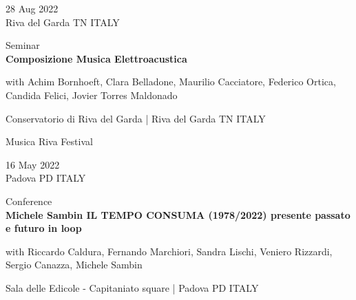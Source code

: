\documentclass[7pt,a4paper]{article}
\begin{document}
\begin{mdframed}[
    backgroundcolor=entrygray,
    linecolor=entrygray,
    linewidth=0pt,
    innerleftmargin=6pt,
    innerrightmargin=6pt,
    innertopmargin=6pt,
    innerbottommargin=6pt,
    skipabove=0pt,
    skipbelow=0pt
]

\begin{minipage}[t]{0.28\textwidth}

28 Aug 2022
\\\scriptsize Riva del Garda TN ITALY

\end{minipage}
\begin{minipage}[t]{0.68\textwidth}
\small Seminar
\\\normalsize \textbf{Composizione Musica Elettroacustica}
\par \scriptsize with Achim Bornhoeft, Clara Belladone, Maurilio Cacciatore, Federico Ortica, Candida Felici, Jovier Torres Maldonado
\par \small Conservatorio di Riva del Garda | \scriptsize Riva del Garda TN ITALY
\vspace{0.1cm}
\par \scriptsize Musica Riva Festival
\end{minipage}
\vspace{0.25cm}
\end{mdframed}


\begin{mdframed}[
    backgroundcolor=white,
    linecolor=white,
    linewidth=0pt,
    innerleftmargin=6pt,
    innerrightmargin=6pt,
    innertopmargin=6pt,
    innerbottommargin=6pt,
    skipabove=0pt,
    skipbelow=0pt
]

\begin{minipage}[t]{0.28\textwidth}

16 May 2022
\\\scriptsize Padova PD ITALY

\end{minipage}
\begin{minipage}[t]{0.68\textwidth}
\small Conference
\\\normalsize \textbf{Michele Sambin IL TEMPO CONSUMA (1978/2022) presente passato e futuro in loop}
\par \scriptsize with Riccardo Caldura, Fernando Marchiori, Sandra Lischi, Veniero Rizzardi, Sergio Canazza, Michele Sambin
\par \small Sala delle Edicole - Capitaniato square | \scriptsize Padova PD ITALY
\vspace{0.1cm}

\end{minipage}
\vspace{0.25cm}
\end{mdframed}
\end{document}
